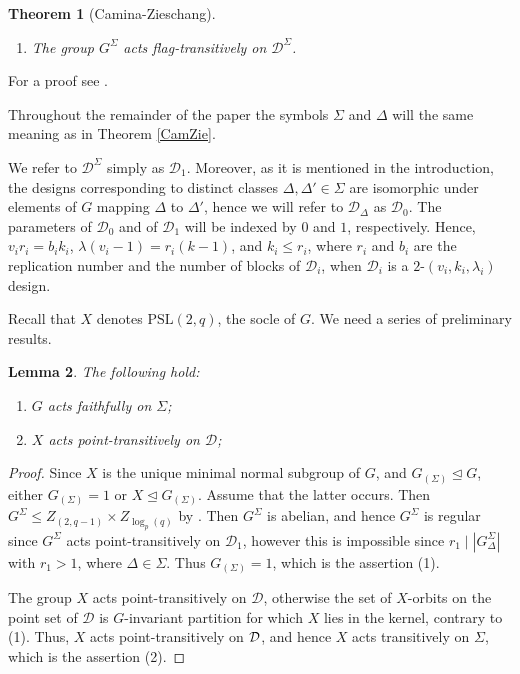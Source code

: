 \documentclass[a4paper,twopage,reqno,12pt]{amsart}
\newtheorem{theorem}{Theorem}[section]
\newtheorem{lemma}[theorem]{Lemma}
\theoremstyle{definition}
\numberwithin{equation}{section}
\newcommand{\PSL}{\mathrm{PSL}}
\renewcommand{\leq}{\leqslant}
\begin{document}
\begin{theorem}[Camina-Zieschang]
\begin{enumerate}
\begin{enumerate}
\item[(iii)] The group $G^{\Sigma}$ acts flag-transitively on $\mathcal{D}^{\Sigma}$.
\end{enumerate}
\end{enumerate}
\end{theorem}

\bigskip
For a proof see \cite[Propositions 2.1 and 2.3]{CZ}.

\bigskip

Throughout the remainder of the paper the symbols $\Sigma$ and $\Delta$ will the same meaning as in Theorem \ref{CamZie}.

We refer to $\mathcal{D}^{\Sigma}$ simply as $\mathcal{D}_{1}$. Moreover, as it is mentioned in the introduction, the designs corresponding to distinct classes $\Delta,\Delta'\in\Sigma$ are isomorphic under elements of $G$ mapping $\Delta$ to $\Delta'$, hence we will refer to $\mathcal{D}_{\Delta }$ as $\mathcal{D}_{0}$. The parameters of $\mathcal{D}_{0}$ and of $\mathcal{D}_{1}$ will be indexed by $0$ and $1$, respectively. Hence, $v_{i}r_{i}=b_{i}k_{i}$, $\lambda (v_{i}-1)=r_{i}(k-1)$, and $k_{i} \leq r_{i}$, where $r_{i}$ and $b_{i}$ are the replication number and the number of blocks of $\mathcal{D}_{i}$, when $\mathcal{D}_{i}$ is a $2$-$(v_{i},k_{i},\lambda_{i})$ design.

\bigskip

Recall that $X$ denotes $\PSL(2,q)$, the socle of $G$. We need a series of preliminary results.

\begin{lemma}
The following hold:
\begin{enumerate}
\item $G$ acts faithfully on $\Sigma $;
\item $X$ acts point-transitively on $\mathcal{D}$;
\end{enumerate}
\end{lemma}

\begin{proof}
Since $X$ is the unique minimal normal subgroup of $G$, and $G_{(\Sigma )}\unlhd G$, either $G_{(\Sigma )}=1$ or $X\trianglelefteq G_{(\Sigma )}$. Assume that the latter occurs. Then $G^{\Sigma }\leq
Z_{(2,q-1)}\times Z_{\log _{p}(q)}$ by \cite[Proposition 2.2.3]{KL}. Then $G^{\Sigma }$ is abelian, and
hence $G^{\Sigma }$ is regular since $G^{\Sigma }$ acts point-transitively on $%
\mathcal{D}_{1}$, however this is impossible since $r_{1}\mid \left\vert
G_{\Delta }^{\Sigma }\right\vert $ with $r_{1}>1$, where $\Delta \in \Sigma $. Thus $G_{(\Sigma )}=1$, which is the assertion (1). 

The group $X$ acts point-transitively on $\mathcal{D}$, otherwise the set of $X$-orbits on the point
set of $\mathcal{D}$ is $G$-invariant partition for which $X$ lies in the
kernel, contrary to (1). Thus, $X$ acts point-transitively on $\mathcal{%
D}$, and hence $X$ acts transitively on $\Sigma $, which is the assertion (2).
\end{proof}
\end{document}
